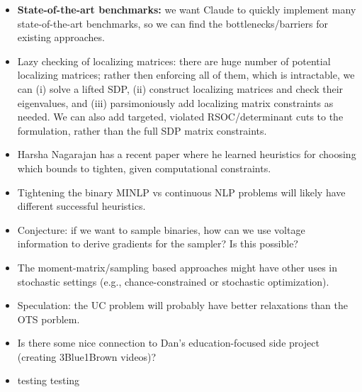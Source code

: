 \documentclass[12pt]{article}
\begin{document}
\begin{itemize}

\item \textbf{State-of-the-art benchmarks:} we want Claude to quickly implement many state-of-the-art benchmarks, so we can find the bottlenecks/barriers for existing approaches.

\item Lazy checking of localizing matrices: there are huge number of potential localizing matrices; rather then enforcing all of them, which is intractable, we can (i) solve a lifted SDP, (ii) construct localizing matrices and check their eigenvalues, and (iii) parsimoniously add localizing matrix constraints as needed. We can also add targeted, violated RSOC/determinant cuts to the formulation, rather than the full SDP matrix constraints.

\item Harsha Nagarajan has a recent paper where he learned heuristics for choosing which bounds to tighten, given computational constraints.

\item Tightening the binary MINLP vs continuous NLP problems will likely have different successful heuristics.

\item Conjecture: if we want to sample binaries, how can we use voltage information to derive gradients for the sampler? Is this possible?

\item The moment-matrix/sampling based approaches might have other uses in stochastic settings (e.g., chance-constrained or stochastic optimization).

\item Speculation: the UC problem will probably have better relaxations than the OTS porblem. 

\item Is there some nice connection to Dan's education-focused side project (creating 3Blue1Brown videos)?

\item testing testing

\end{itemize}
\end{document}
